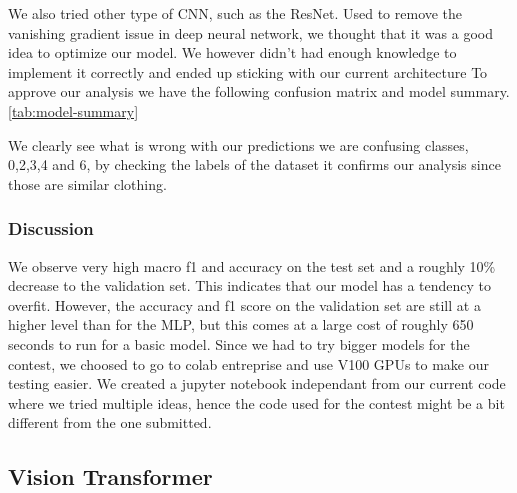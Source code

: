 \begin{center}
  \label{tab:table_cnn}
\end{center}
We also tried other type of CNN, such as the ResNet. Used to remove the vanishing gradient issue in deep neural network, we thought that it was a good idea to optimize our model. We however didn't had enough knowledge to implement it correctly and ended up sticking with our current architecture
To approve our analysis we have the following confusion matrix and model summary. \cref{tab:model-summary}

We clearly see what is wrong with our predictions we are confusing classes, 0,2,3,4 and 6, by checking the labels of the dataset it confirms our analysis since those are similar clothing.

\subsubsection{Discussion}
We observe very high macro f1 and accuracy on the test set and a roughly 10\% decrease to the validation set. This indicates that our model has a tendency to overfit. However, the accuracy and f1 score on the validation set are still at a higher level than for the MLP, but this comes at a large cost of roughly 650 seconds to run for a basic model. Since we had to try bigger models for the contest, we choosed to go to colab entreprise and use V100 GPUs to make our testing easier. We created a jupyter notebook independant from our current code where we tried multiple ideas, hence the code used for the contest might be a bit different from the one submitted.

\subsection{Vision Transformer}
